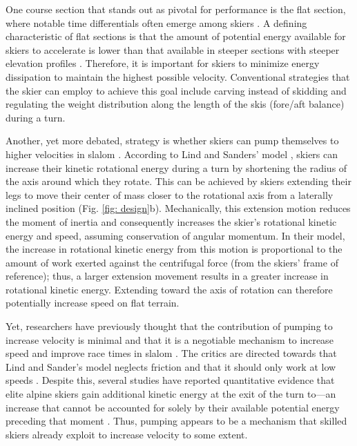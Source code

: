 \documentclass{article}
\begin{document}
One course section that stands out as pivotal for performance is the flat section, where notable time differentials often emerge among skiers \cite{supej_new_2011, supej_relations_2006}. A defining characteristic of flat sections is that the amount of potential energy available for skiers to accelerate is lower than that available in steeper sections with steeper elevation profiles \cite{supej_differential_2008}. Therefore, it is important for skiers to minimize energy dissipation to maintain the highest possible velocity. Conventional strategies that the skier can employ to achieve this goal include carving instead of skidding and regulating the weight distribution along the length of the skis (fore/aft balance) during a turn\cite{reid_turn_2009, reid_kinematic_2010,supej_impact_2015, supej_differential_2008}.

Another, yet more debated, strategy is whether skiers can pump themselves to higher velocities in slalom \cite{lind_physics_2013, luginbuhl_identification_2023, mote_accelerations_1983}. According to Lind and Sanders' model \cite{lind_physics_2013}, skiers can increase their kinetic rotational energy during a turn by shortening the radius of the axis around which they rotate. This can be achieved by skiers extending their legs to move their center of mass closer to the rotational axis from a laterally inclined position (Fig. \ref{fig: design}b). Mechanically, this extension motion reduces the moment of inertia and consequently increases the skier's rotational kinetic energy and speed, assuming conservation of angular momentum. In their model, the increase in rotational kinetic energy from this motion is proportional to the amount of work exerted against the centrifugal force (from the skiers' frame of reference); thus, a larger extension movement results in a greater increase in rotational kinetic energy. Extending toward the axis of rotation can therefore potentially increase speed on flat terrain.

Yet, researchers have previously thought that the contribution of pumping to increase velocity is minimal and that it is a negotiable mechanism to increase speed and improve race times in slalom \cite{supej_differential_2008, supej_doba_2001}. The critics are directed towards that Lind and Sander's model neglects friction and that it should only work at low speeds \cite{supej_differential_2008, supej_how_2010}. Despite this, several studies have reported quantitative evidence that elite alpine skiers gain additional kinetic energy at the exit of the turn to—an increase that cannot be accounted for solely by their available potential energy preceding that moment \cite{reid_kinematic_2010, supej_differential_2008, supej_how_2010, supej_impact_2015}. Thus, pumping appears to be a mechanism that skilled skiers already exploit to increase velocity to some extent. 
\end{document}
